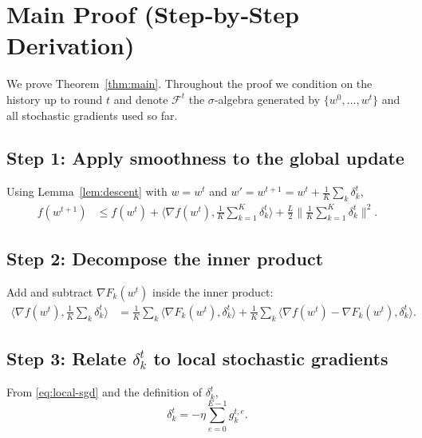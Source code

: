 \documentclass{article}
\begin{document}
\section*{Main Proof (Step‑by‑Step Derivation)}
We prove Theorem~\ref{thm:main}. Throughout the proof we condition on the history up to round $t$ and denote $\mathcal{F}^{t}$ the $\sigma$‑algebra generated by $\{w^{0},\dots,w^{t}\}$ and all stochastic gradients used so far.

\subsection*{Step 1: Apply smoothness to the global update}
Using Lemma~\ref{lem:descent} with $w=w^{t}$ and $w'=w^{t+1}=w^{t}+\frac{1}{K}\sum_{k}\delta_k^{t}$,
\begin{align}
f(w^{t+1})
&\le f(w^{t})+\Big\langle\nabla f(w^{t}),\frac{1}{K}\sum_{k=1}^{K}\delta_k^{t}\Big\rangle
   +\frac{L}{2}\Big\|\frac{1}{K}\sum_{k=1}^{K}\delta_k^{t}\Big\|^{2}. \tag{Step 1}
\end{align}

\subsection*{Step 2: Decompose the inner product}
Add and subtract $\nabla F_k(w^{t})$ inside the inner product:
\begin{align}
\Big\langle\nabla f(w^{t}),\frac{1}{K}\sum_{k}\delta_k^{t}\Big\rangle
&=\frac{1}{K}\sum_{k}\Big\langle\nabla F_k(w^{t}),\delta_k^{t}\Big\rangle
   +\frac{1}{K}\sum_{k}\Big\langle\nabla f(w^{t})-\nabla F_k(w^{t}),\delta_k^{t}\Big\rangle. \tag{Step 2}
\end{align}

\subsection*{Step 3: Relate $\delta_k^{t}$ to local stochastic gradients}
From \eqref{eq:local-sgd} and the definition of $\delta_k^{t}$,
\[
\delta_k^{t}= -\eta\sum_{e=0}^{E-1} g_{k}^{t,e}. \tag{Step 3}
\]
\end{document}
